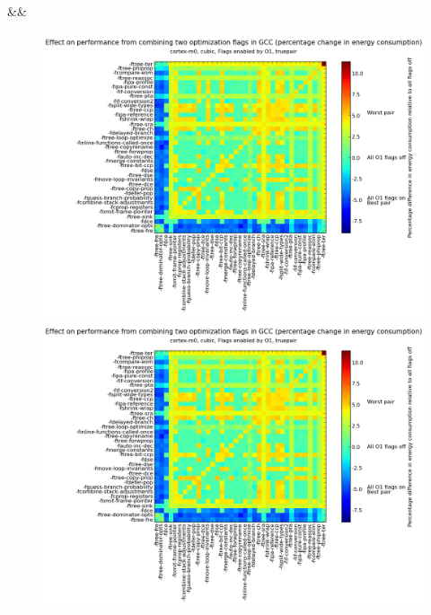 \documentclass[twocolumn]{article}
\let\oldcaption\caption
\renewcommand{\caption}[1]{\oldcaption{\textup{#1}}}
\begin{document}
\begin{table}
\begin{tabular}
	&&\\
	\end{tabular}

	\caption{Table showing the most effective option for each platform-benchmark combination. Options considered were
	optimizations enabled by \texttt{O1}, \texttt{O2} and \texttt{O3} levels.}
	\label{Table:BestFlags}
\end{table}

\begin{figure}
	\centering
    \begin{minipage}[l]{0.98\columnwidth}
        \centering
		\includegraphics[width=1.0\linewidth, clip, trim= 8.8cm 0 4.8cm 2cm]{cortex-m0/o1cub_-7p5_10.png}
    \end{minipage}
    \hfill
    \begin{minipage}[l]{0.07\columnwidth}
        \centering
        \includegraphics[width=1.0\linewidth, clip, trim= 29.1cm 0 0cm 1.7cm]{cortex-m0/o1cub_-7p5_10.png}

\end{minipage}
\end{figure}
\end{document}
